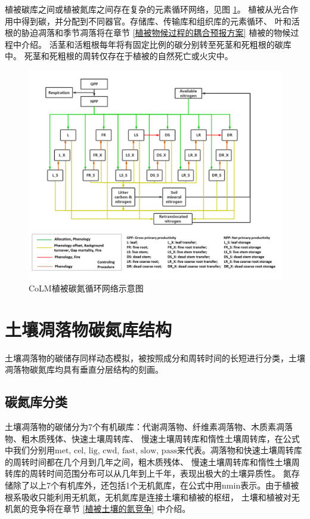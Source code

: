 植被碳库之间或植被氮库之间存在复杂的元素循环网络，见图 \ref{fig:CoLM植被碳氮循环网络示意图}。
植被从光合作用中得到碳，并分配到不同器官。存储库、传输库和组织库的元素循环、
叶和活根的胁迫凋落和季节凋落将在章节 \ref{植被物候过程的耦合预报方案} 植被的物候过程中介绍。
活茎和活粗根每年将有固定比例的碳分别转至死茎和死粗根的碳库中。
死茎和死粗根的周转仅存在于植被的自然死亡或火灾中。
{
  \begin{figure}[htbp]
    \centering
    \includegraphics{Figures/碳氮库结构/CoLM植被碳氮循环网络示意图.png}
    \caption{CoLM植被碳氮循环网络示意图 \citep{lu2020full}}
    \label{fig:CoLM植被碳氮循环网络示意图}
  \end{figure}
}

\section{土壤凋落物碳氮库结构}\label{土壤凋落物碳氮库结构}
土壤凋落物的碳储存同样动态模拟，被按照成分和周转时间的长短进行分类，土壤凋落物碳氮库均具有垂直分层结构的刻画。
\subsection{碳氮库分类}\label{碳氮库分类}
土壤凋落物的碳储分为7个有机碳库：代谢凋落物、纤维素凋落物、木质素凋落物、粗木质残体、快速土壤周转库、
慢速土壤周转库和惰性土壤周转库，在公式中我们分别用${\mathrm {met}}$, ${\mathrm {cel}}$, ${\mathrm {lig}}$, ${\mathrm {cwd}}$, ${\mathrm {fast}}$, ${\mathrm {slow}}$, ${\mathrm {pass}}$来代表。凋落物和快速土壤周转库的周转时间都在几个月到几年之间，粗木质残体、
慢速土壤周转库和惰性土壤周转库的周转时间范围分布可以从几年到上千年，表现出极大的土壤异质性。
氮存储除了以上7个有机库外，还包括1个无机氮库，在公式中用${\mathrm {nmin}}$表示。由于植被根系吸收只能利用无机氮，无机氮库是连接土壤和植被的枢纽，
土壤和植被对无机氮的竞争将在章节 \ref{植被土壤的氮竞争} 中介绍。


